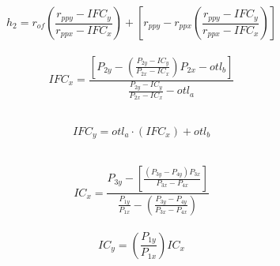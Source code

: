 \documentclass[14pt,a4paper]{report}  %
\newcommand{\fourteen}{\fontsize{14pt}{\baselineskip}\selectfont}%
\begin{document}
{      \begin{equation}
      h_{2} = r_{of}\left (\frac{r_{ppy}-IFC_{y}}{r_{ppx}-IFC_{x}}\right ) + \left[ r_{ppy}-r_{ppx}\left( \frac{r_{ppy}-IFC_{y}}{r_{ppx}-IFC_{x}} \right) \right]
      \end{equation}  
      \hspace*{\fill} \\
      
      \fourteen {其中}
      \begin{equation}
      IFC_{x} = \frac{\left[ P_{2y} - \left( \frac{P_{2y} - IC_{y}}{P_{2x} - IC_{x}} \right )P_{2x} - otl_{b} \right ]}{\frac{P_{2y} - IC_{y}}{P_{2x} - IC_{x}}-otl_{a}}
      \end{equation}
      \hspace*{\fill} \\
      

      \begin{flushleft}
      \begin{equation}
      IFC_{y} = otl_{a} \cdot \left( IFC_{x} \right ) + otl_{b}
      \end{equation}
      \end{flushleft}
      \hspace*{\fill} \\
      
      \begin{equation}
      IC_{x} = \frac{P_{3y} - \left [ \frac {(P_{3y} - P_{4y})P_{3x}}{P_{3x}-P_{4x}} \right ]}{\frac{P_{1y}}{P_{1x}}-\left ( \frac{P_{3y} - P_{4y}}{P_{3x}-P_{4x}} \right )}
      \end{equation}
      \hspace*{\fill} \\
      
      \begin{equation}
      IC_{y} = \left ( \frac{P_{1y}}{P_{1x}} \right ) IC_{x}
      \end{equation}
      \hspace*{\fill} \\
      
}
\end{document}
